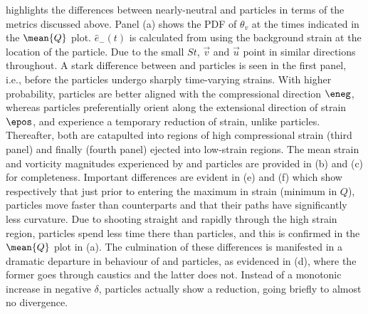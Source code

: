  highlights the differences between nearly-neutral \cs and \su particles in terms of the metrics discussed above. Panel (a) shows the PDF of $\theta_v$ at the times indicated in the $\mean{Q}$ plot. $\hat e_-(t)$ is calculated from  using the background strain at the location of the particle.
Due to the small $St$, $\vec{v}$ and $\vec{u}$ point in similar directions throughout.
A stark difference between \cs and \su particles is seen in the first panel, i.e., before the particles undergo sharply time-varying strains. With higher probability, \cs particles are better aligned with the compressional direction $\eneg$, whereas \su particles preferentially orient along the extensional direction of strain $\epos$, and experience a temporary reduction of strain, unlike \cs particles. Thereafter, both are catapulted into regions of high compressional strain (third panel) and finally (fourth panel) ejected into low-strain regions. The mean strain and vorticity magnitudes experienced by \cs and \su particles are provided in  (b) and (c) for completeness. Important differences are evident in  (e) and (f) which show respectively that just prior to entering the maximum in strain (minimum in $Q$), \su particles move faster than \cs counterparts and that their paths have significantly less curvature. Due to shooting straight and rapidly through the high strain region, \su particles spend less time there than \cs particles, and this is confirmed in the $\mean{Q}$ plot in (a). The culmination of these differences is manifested in a dramatic departure in behaviour of \cs and \su particles, as evidenced in  (d), where the former goes through caustics and the latter does not. Instead of a monotonic increase in negative $\delta$, \su particles actually show a reduction, going briefly to almost no divergence. 

